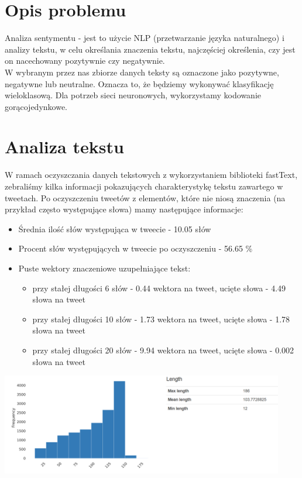 \documentclass[11pt, a4paper, notitlepage]{report}
\begin{document}
\section{Opis problemu}
Analiza sentymentu - jest to użycie NLP (przetwarzanie języka naturalnego) i analizy tekstu, w celu określania znaczenia tekstu, najczęściej określenia, czy jest on nacechowany pozytywnie czy negatywnie.
\\
W wybranym przez nas zbiorze danych teksty są oznaczone jako pozytywne, negatywne lub neutralne. Oznacza to, że będziemy wykonywać klasyfikację wieloklasową. Dla potrzeb sieci neuronowych, wykorzystamy kodowanie gorącojedynkowe.

\section{Analiza tekstu}
W ramach oczyszczania danych tekstowych z wykorzystaniem biblioteki fastText, zebraliśmy kilka informacji pokazujących charakterystykę tekstu zawartego w tweetach. Po oczyszczeniu tweetów z elementów, które nie niosą znaczenia (na przykład często występujące słowa) mamy następujące informacje:
\begin{itemize}
    \item Średnia ilość słów występująca w tweecie - 10.05 słów
    \item Procent słów występujących w tweecie po oczyszczeniu - 56.65 \%
    \item Puste wektory znaczeniowe uzupełniające tekst:
    \begin{itemize}
    \item  przy stałej długości 6 słów - 0.44 wektora na tweet, ucięte słowa - 4.49 słowa na tweet
    \item  przy stałej długości 10 słów - 1.73 wektora na tweet, ucięte słowa - 1.78 słowa na tweet
    \item  przy stałej długości 20 słów - 9.94 wektora na tweet, ucięte słowa - 0.002 słowa na tweet
    \end{itemize}
\end{itemize}

\begin{center}
\includegraphics[width=350pt]{graphics/analiza_dlugosci_tekstu.png}
\end{center}
\end{document}
